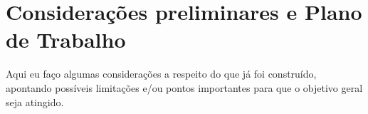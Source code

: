 \chapter{Considerações preliminares e Plano de Trabalho}
\label{cap:plano-de-trabalho}

Aqui eu faço algumas considerações a respeito do que já foi construído, apontando
possíveis limitações e/ou pontos importantes para que o objetivo geral seja atingido.
